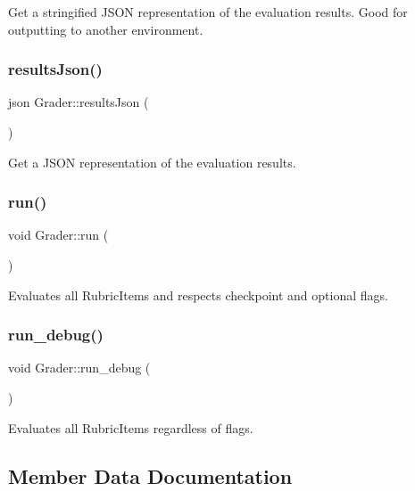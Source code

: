 Get a stringified J\+S\+ON representation of the evaluation results. Good for outputting to another environment. \hypertarget{class_grader_a0eb875277cac4c26fa67e5164caa3b38}{}\label{class_grader_a0eb875277cac4c26fa67e5164caa3b38} 
\subsubsection{\texorpdfstring{results\+Json()}{resultsJson()}}
{\footnotesize\ttfamily json Grader\+::results\+Json (\begin{DoxyParamCaption}{ }\end{DoxyParamCaption})}

Get a J\+S\+ON representation of the evaluation results. \hypertarget{class_grader_a1c0d301659e72b58cc5214663f580c85}{}\label{class_grader_a1c0d301659e72b58cc5214663f580c85} 
\subsubsection{\texorpdfstring{run()}{run()}}
{\footnotesize\ttfamily void Grader\+::run (\begin{DoxyParamCaption}{ }\end{DoxyParamCaption})}

Evaluates all Rubric\+Items and respects checkpoint and optional flags. \hypertarget{class_grader_ac4cb9fc1094fea57d40c277f434d418d}{}\label{class_grader_ac4cb9fc1094fea57d40c277f434d418d} 
\subsubsection{\texorpdfstring{run\+\_\+debug()}{run\_debug()}}
{\footnotesize\ttfamily void Grader\+::run\+\_\+debug (\begin{DoxyParamCaption}{ }\end{DoxyParamCaption})}

Evaluates all Rubric\+Items regardless of flags. 

\subsection{Member Data Documentation}
\hypertarget{class_grader_a88ad71fe69b966fa4faf4c77d4b09842}{}\label{class_grader_a88ad71fe69b966fa4faf4c77d4b09842} 
